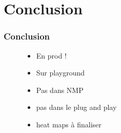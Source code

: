 \documentclass[table]{beamer}
\begin{document}
\section{Conclusion}

\begin{frame}
  \frametitle{Conclusion}
  \begin{description}
  \item[]
    \begin{itemize} 
        \item En prod !
        \item Sur playground
        \newline
        \item Pas dans NMP
        \item pas dans le plug and play
        \newline
        \item heat maps à finaliser
    \end{itemize}
  \end{description}
\end{frame}

\begin{frame}
  \titlepage
\end{frame}
\end{document}
